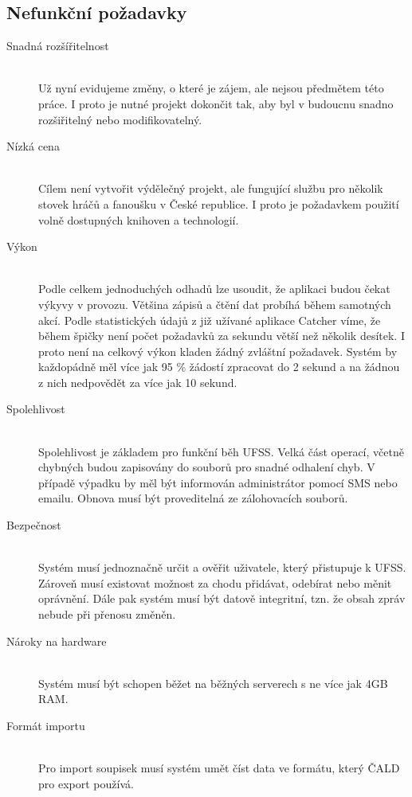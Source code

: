 \documentclass[thesis=B,czech]{FITthesis}[2012/06/26]
\begin{document}
\subsection{Nefunkční požadavky}


\begin{description}
  \item[Snadná rozšířitelnost] \hfill \\
  Už nyní evidujeme změny, o které je zájem, ale nejsou předmětem této práce.
  I proto je nutné projekt dokončit tak, aby byl v budoucnu snadno rozšiřitelný nebo
  modifikovatelný.

  \item[Nízká cena] \hfill \\
  Cílem není vytvořit výdělečný projekt, ale fungující službu pro několik stovek hráčů
  a fanoušku v České republice. I proto je požadavkem použití volně dostupných
  knihoven a technologií.

  \item[Výkon] \hfill \\
  Podle celkem jednoduchých odhadů lze usoudit, že aplikaci budou čekat výkyvy v provozu.
  Většina zápisů a čtění dat probíhá během samotných akcí. Podle statistických údajů
  z již užívané aplikace Catcher víme, že během špičky není počet požadavků za sekundu
  větší než několik desítek. I proto není na celkový výkon kladen žádný zvláštní požadavek.
  Systém by každopádně měl více jak 95 \% žádostí zpracovat do 2 sekund a na žádnou z nich
  nedpovědět za více jak 10 sekund.

  \item[Spolehlivost] \hfill \\
  Spolehlivost je základem pro funkční běh UFSS. Velká část operací, včetně chybných budou
  zapisovány do souborů pro snadné odhalení chyb. V případě výpadku by měl být informován
  administrátor pomocí SMS nebo emailu. Obnova musí být proveditelná ze zálohovacích souborů.

  \item[Bezpečnost] \hfill \\
  Systém musí jednoznačně určit a ověřit uživatele, který přistupuje k UFSS. Zároveň musí
  existovat možnost za chodu přidávat, odebírat nebo měnit oprávnění. Dále pak systém musí
  být datově integritní, tzn. že obsah zpráv nebude při přenosu změněn.

  \item[Nároky na hardware] \hfill \\
  Systém musí být schopen běžet na běžných serverech s ne více jak 4GB RAM.

  \item[Formát importu] \hfill \\
  Pro import soupisek musí systém umět číst data ve formátu, který ČALD pro export používá.
\end{description}
\end{document}
